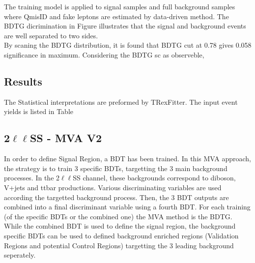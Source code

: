 The training model is applied to signal samples and full background samples where QmisID and fake leptons are estimated by data-driven method. The BDTG dicrimination in Figure illustrates that the signal and background events are well separated to two sides.\\
By scaning the BDTG distribution, it is found that BDTG cut at 0.78 gives 0.058 significance in maximum. Considering the BDTG sc as observeble, 
\subsection{Results}
The Statistical interpretations are preformed by TRexFitter. The input event yields is listed in Table

\subsection{2$\ell \ell$SS - MVA V2}

In order to define Signal Region, a BDT has been trained. In this MVA
approach, the strategy is to train 3 specific BDTs, targetting the 3 main
background processes. In the 2$\mathrm{\ell \ell}$SS channel, these
backgrounds correspond to diboson, V+jets and ttbar
productions. Various discriminating 
variables are used according the targetted background process. Then, the 3 BDT
outputs are combined into a final discriminant variable using a fourth
BDT. For each training (of the specific BDTs or the combined one) the MVA
method is the BDTG. 
While the combined BDT is used to define the signal region, the
background specific BDTs can be used to defined background enriched
regions (Validation Regions and potential Control Regions) targetting
the 3 leading background seperately.  

